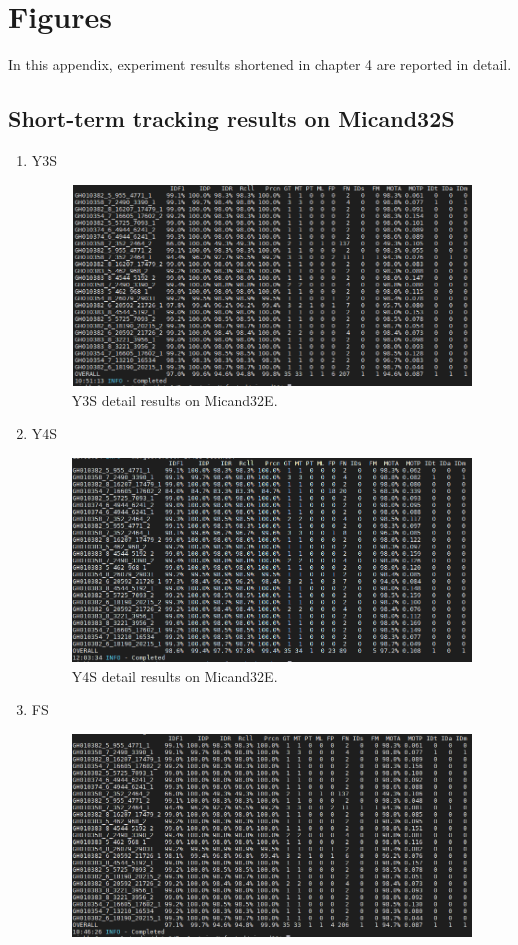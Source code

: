 \chapter{Figures}
In this appendix, experiment results shortened in chapter 4 are reported in detail.
\section{Short-term tracking results on Micand32S}
\begin{enumerate}
	\item Y3S
		\begin{figure}
			\centerline{\includegraphics[width=1\linewidth]{Figs/Evaluation/micand26/y3s.png}}
			\caption{Y3S detail results on Micand32E.}
		\end{figure}
	\item Y4S
	\begin{figure}
		\centerline{\includegraphics[width=1\linewidth]{Figs/Evaluation/micand26/y4s.png}}
		\caption{Y4S detail results on Micand32E.}
	\end{figure}
	\item FS
		\begin{figure}
			\centerline{\includegraphics[width=1\linewidth]{Figs/Evaluation/micand26/fs.png}}

\end{figure}
\end{enumerate}
